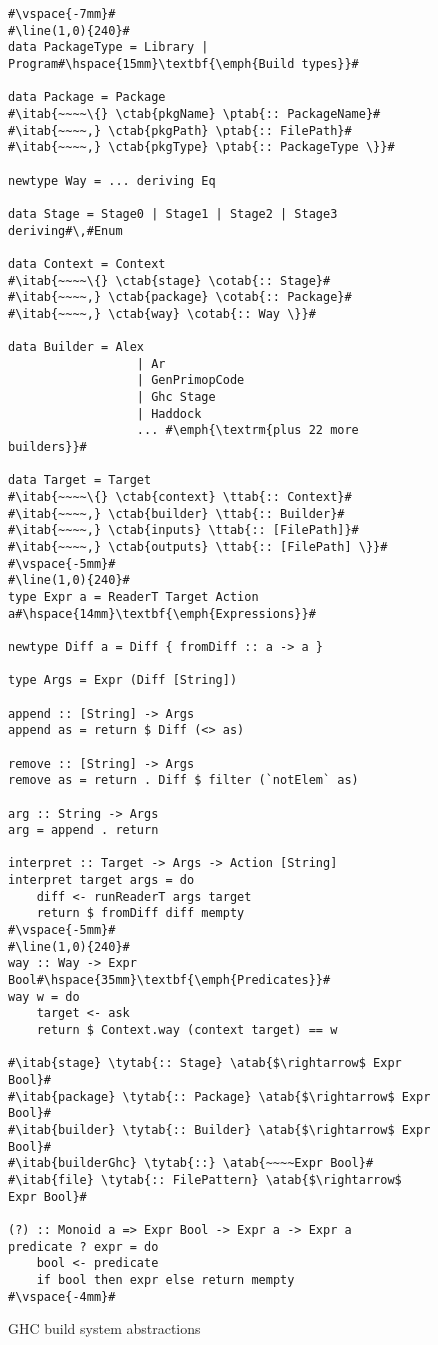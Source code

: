 \begin{figure}
\begin{lstlisting}
#\vspace{-7mm}#
#\line(1,0){240}#
data PackageType = Library | Program#\hspace{15mm}\textbf{\emph{Build types}}#

data Package = Package
#\itab{~~~~\{} \ctab{pkgName} \ptab{:: PackageName}#
#\itab{~~~~,} \ctab{pkgPath} \ptab{:: FilePath}#
#\itab{~~~~,} \ctab{pkgType} \ptab{:: PackageType \}}#

newtype Way = ... deriving Eq

data Stage = Stage0 | Stage1 | Stage2 | Stage3 deriving#\,#Enum

data Context = Context
#\itab{~~~~\{} \ctab{stage} \cotab{:: Stage}#
#\itab{~~~~,} \ctab{package} \cotab{:: Package}#
#\itab{~~~~,} \ctab{way} \cotab{:: Way \}}#

data Builder = Alex
                  | Ar
                  | GenPrimopCode
                  | Ghc Stage
                  | Haddock
                  ... #\emph{\textrm{plus 22 more builders}}#

data Target = Target
#\itab{~~~~\{} \ctab{context} \ttab{:: Context}#
#\itab{~~~~,} \ctab{builder} \ttab{:: Builder}#
#\itab{~~~~,} \ctab{inputs} \ttab{:: [FilePath]}#
#\itab{~~~~,} \ctab{outputs} \ttab{:: [FilePath] \}}#
#\vspace{-5mm}#
#\line(1,0){240}#
type Expr a = ReaderT Target Action a#\hspace{14mm}\textbf{\emph{Expressions}}#

newtype Diff a = Diff { fromDiff :: a -> a }

type Args = Expr (Diff [String])

append :: [String] -> Args
append as = return $ Diff (<> as)

remove :: [String] -> Args
remove as = return . Diff $ filter (`notElem` as)

arg :: String -> Args
arg = append . return

interpret :: Target -> Args -> Action [String]
interpret target args = do
    diff <- runReaderT args target
    return $ fromDiff diff mempty
#\vspace{-5mm}#
#\line(1,0){240}#
way :: Way -> Expr Bool#\hspace{35mm}\textbf{\emph{Predicates}}#
way w = do
    target <- ask
    return $ Context.way (context target) == w

#\itab{stage} \tytab{:: Stage} \atab{$\rightarrow$ Expr Bool}#
#\itab{package} \tytab{:: Package} \atab{$\rightarrow$ Expr Bool}#
#\itab{builder} \tytab{:: Builder} \atab{$\rightarrow$ Expr Bool}#
#\itab{builderGhc} \tytab{::} \atab{~~~~Expr Bool}#
#\itab{file} \tytab{:: FilePattern} \atab{$\rightarrow$ Expr Bool}#

(?) :: Monoid a => Expr Bool -> Expr a -> Expr a
predicate ? expr = do
    bool <- predicate
    if bool then expr else return mempty
#\vspace{-4mm}#
\end{lstlisting}
\caption{GHC build system abstractions\label{fig:abstractions}}
\end{figure}

